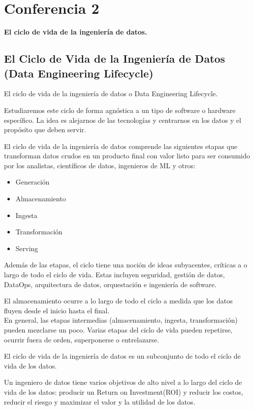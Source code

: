 \documentclass[12pt]{book}
\begin{document}
\chapter{Conferencia 2}
\normalfont\LARGE \textbf{El ciclo de vida de la ingeniería de datos.}
\normalfont\small\\

\section{El Ciclo de Vida de la Ingeniería de Datos (Data Engineering Lifecycle)}
El ciclo de vida de la ingeniería de datos o Data Engineering Lifecycle.

Estudiaremos este ciclo de forma agnóstica a un tipo de software o hardware específico.
La idea es alejarnos de las tecnologías y centrarnos en los datos y el propósito que deben servir.

El ciclo de vida de la ingeniería de datos comprende las siguientes etapas que transforman datos crudos en un producto final con valor listo para ser consumido por los analistas, científicos de datos, ingenieros de ML y otros:

\begin{itemize}
    \item Generación
    \item Almacenamiento
    \item Ingesta
    \item Transformación
    \item Serving
\end{itemize}
Además de las etapas, el ciclo tiene una noción de ideas subyacentes, críticas a o largo de todo el ciclo de vida. Estas incluyen seguridad, gestión de datos, DataOps, arquitectura de datos, orquestación e ingeniería de software.

El almacenamiento ocurre a lo largo de todo el ciclo a medida que los datos fluyen desde el inicio hasta el final.\\
En general, las etapas intermedias (almacenamiento, ingesta, transformación) pueden mezclarse un poco. Varias etapas del ciclo de vida pueden repetirse, ocurrir fuera de orden, superponerse o entrelazarse.

El ciclo de vida de la ingeniería de datos es un subconjunto de todo el ciclo de vida de los datos.

Un ingeniero de datos tiene varios objetivos de alto nivel a lo largo del ciclo de vida de los datos: producir un Return on Investment(ROI) y reducir los costos, reducir el riesgo y maximizar el valor y la utilidad de los datos.
\end{document}
